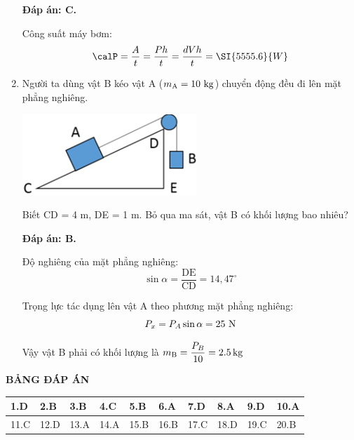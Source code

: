 \begin{enumerate}[label=\bfseries Câu \arabic*:]
{	}
	
	\loigiai
	{\textbf{Đáp án: C.}
		
		Công suất máy bơm:
		$$\calP = \dfrac{A}{t} = \dfrac{Ph}{t} = \dfrac{dVh}{t} = \SI{5555.6}{W}$$
	}
	\item {}
	
	\cauhoi
	{Người ta dùng vật B kéo vật A ($m_\text A = 10\ \text{kg}$) chuyển động đều đi lên mặt phẳng nghiêng.
		\begin{center}
			\includegraphics[scale=1]{../figs/VN10-2021-PH-TP0003-1.png}
		\end{center}
		Biết CD = 4 m, DE = 1 m. Bỏ qua ma sát, vật B có khối lượng bao nhiêu?
		
	}
	
	\loigiai
	{\textbf{Đáp án: B.}
		
		Độ nghiêng của mặt phẳng nghiêng:
		$$\sin \alpha = \dfrac{\text{DE}}{\text{CD}} = 14,47^\circ$$
		
		Trọng lực tác dụng lên vật A theo phương mặt phẳng nghiêng:
		$$P_x=P_A \sin \alpha = 25\ \text N$$
		
		Vậy vật B phải có khối lượng là $m_\text B = \dfrac{P_B}{10} = \SI{2.5}{kg}$
	}
	
\end{enumerate}

\whiteBGstarEnd

\loigiai
{
	\begin{center}
		\textbf{BẢNG ĐÁP ÁN}
	\end{center}
	\begin{center}
		\begin{tabular}{|m{2.8em}|m{2.8em}|m{2.8em}|m{2.8em}|m{2.8em}|m{2.8em}|m{2.8em}|m{2.8em}|m{2.8em}|m{2.8em}|}
			\hline
			1.D  & 2.B  & 3.B  & 4.C  & 5.B  & 6.A  & 7.D  & 8.A  & 9.D  & 10.A  \\
			\hline
			11.C  & 12.D  & 13.A  & 14.A  & 15.B  & 16.B  & 17.C  & 18.D  & 19.C  & 20.B  \\
			\hline
			
		\end{tabular}
	\end{center}
}
